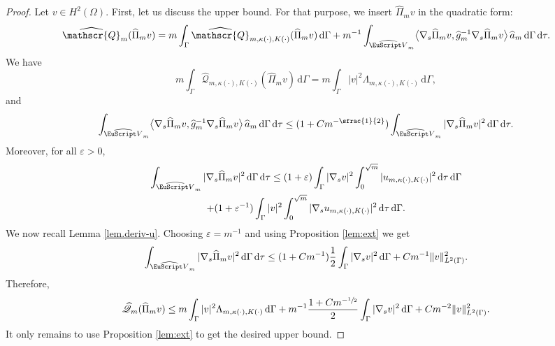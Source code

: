 \documentclass[JEP,XML,SOM,Unicode]{cedram}
\let\mathcal \EuScript
\newcommand{\scrQ}{\mathscr{Q}}
\theoremstyle{plain}
\theoremstyle{definition}
\newcommand{\dx}{\mathrm{\,d}}
\begin{document}
\begin{proof}
Let $v\in H^{2}(\Omega)$. First, let us discuss the upper bound. For that purpose, we insert $\widehat{\Pi}_m v$ in the quadratic form:
\begin{equation*}
\widehat{\scrQ}_{m} (\widehat{\Pi}_m v )=
m\int_\Gamma
\widehat{\scrQ}_{m,\kappa(\cdot),K(\cdot)}(\widehat{\Pi}_m v )\dx
\Gamma
+m^{-1}\int_{\widehat{\mathcal V}_{m}}\bigl\langle\nabla_{s} \widehat{\Pi}_m v,\widehat g^{-1}_m\nabla_{s} \widehat{\Pi}_m v \bigr\rangle\,\widehat a_m \dx \Gamma \dx\tau.
\end{equation*}
We have
\[
m\int_\Gamma \widehat{\scrQ}_{m,\kappa(\cdot),K(\cdot)}(\widehat{\Pi}_m v )\dx\Gamma
= m\int_\Gamma |v|^2\Lambda_{m,\kappa(\cdot),K(\cdot)}\dx\Gamma,
\]
and
\[\int_{\widehat{\mathcal V}_{m}} \bigl\langle\nabla_{s} \widehat{\Pi}_m v,\widehat g^{-1}_m\nabla_{s} \widehat{\Pi}_m v \bigr\rangle\,\widehat a_m \dx \Gamma \dx\tau
\leq (1+Cm^{-\sfrac{1}{2}})\int_{\widehat{\mathcal V}_{m}}|\nabla_{s} \widehat{\Pi}_m v|^2 \dx \Gamma \dx\tau.
\]
Moreover, for all $\varepsilon>0$,
\begin{multline*}
\int_{\widehat{\mathcal V}_{m}}|\nabla_{s} \widehat{\Pi}_m v|^2 \dx \Gamma \dx\tau
\leq(1+\varepsilon)\int_\Gamma
|\nabla_s v|^2
\int_0^{\sqrt{m}}
|u_{m,\kappa(\cdot),K(\cdot)}|^2
\dx\tau
\dx\Gamma\\
+(1+\varepsilon^{-1})\int_{\Gamma}|v|^2\int_0^{\sqrt{m}}|\nabla_{s} u_{m,\kappa(\cdot),K(\cdot)}|^2\dx\tau\dx\Gamma.
\end{multline*}
We now recall Lemma \ref{lem.deriv-u}. Choosing $\varepsilon=m^{-1}$ and using Proposition \ref{lem:ext} we get
\[\int_{\widehat{\mathcal V}_{m}}|\nabla_{s} \widehat{\Pi}_m v|^2 \dx \Gamma \dx\tau\leq (1+Cm^{-1})\frac{1}{2}\int_{\Gamma}|\nabla_{s} v|^2\dx\Gamma+Cm^{-1}\|v\|^2_{L^2(\Gamma)}.\]
Therefore,
\[
\widehat{\scrQ}_{m} (\widehat{\Pi}_m v )\leq m\int_\Gamma |v|^2\Lambda_{m,\kappa(\cdot),K(\cdot)}\dx\Gamma+m^{-1}\frac{1+Cm^{-\sfrac{1}{2}}}{2}\int_{\Gamma}|\nabla_{s} v|^2\dx\Gamma+Cm^{-2}\|v\|^2_{L^2(\Gamma)}.
\]
It only remains to use Proposition \ref{lem:ext} to get the desired upper bound.


\end{proof}
\end{document}
